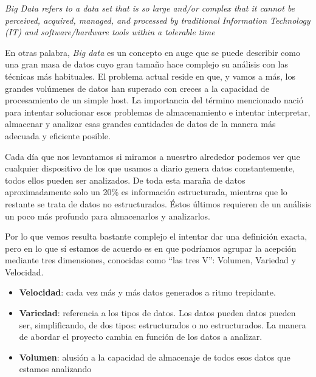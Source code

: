 \begin{displayquote}
	\emph{Big Data refers to a data set that is so large and/or complex that it cannot be perceived, acquired, managed, and processed by traditional Information Technology (IT) and software/hardware tools within a tolerable time} \cite{laval_introduction}
\end{displayquote} 

En otras palabra, \emph{Big data} es un concepto en auge que se puede describir como una gran masa de datos cuyo gran tamaño hace complejo su análisis con las técnicas más habituales. El problema actual reside en que, y vamos a más, los grandes volúmenes de datos han superado con creces a la capacidad de procesamiento de un simple host. La importancia del término mencionado nació para intentar solucionar esos problemas de almacenamiento e intentar interpretar, almacenar y analizar esas grandes cantidades de datos de la manera más adecuada y eficiente posible.

Cada día que nos levantamos si miramos a nuesrtro alrededor podemos ver que cualquier dispositivo de los que usamos a diario genera datos constantemente, todos ellos pueden ser analizados. De toda esta maraña de datos aproximadamente solo un 20\% es información estructurada, mientras que lo restante se trata de datos no estructurados. Éstos últimos requieren de un análisis un poco más profundo para almacenarlos y analizarlos. 

Por lo que vemos resulta bastante complejo el intentar dar una definición exacta, pero en lo que sí estamos de acuerdo es en que podríamos agrupar la acepción mediante tres dimensiones, conocidas como “las tres V”: Volumen, Variedad y Velocidad.

\begin{itemize}
	\tightlist
	\item
	\textbf{Velocidad}: cada vez más y más datos generados a ritmo trepidante.
	\item
	\textbf{Variedad}: referencia a los tipos de datos. Los datos pueden datos pueden ser, simplificando, de dos tipos: estructurados o no estructurados. La manera de abordar el proyecto cambia en función de los datos a analizar.
	\item
	\textbf{Volumen}: alusión a la capacidad de almacenaje de todos esos datos que estamos analizando
\end{itemize}


